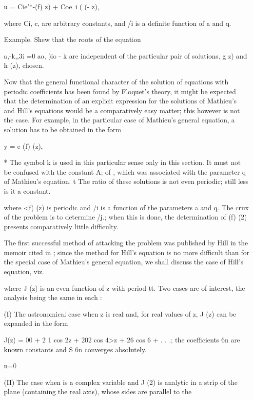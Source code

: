 u = Cie'*-(f) z) + Coe~i ( (- z),

where Ci, c, are arbitrary constants, and /i is a definite function of
a and q.

Example. Shew that the roots of the equation

a,-k,,3i =0 ao, )io - k are independent of the particular pair of
solutions, g z) and h (z), chosen.


Now that the general functional character of the solution of equations
with periodic coefficients has been found by Floquet's theory, it
might be expected that the determination of an explicit expression for
the solutions of Mathieu's and Hill's equations would be a
comparatively easy matter; this however is not the case. For example,
in the particular case of Mathieu's general equation, a solution has
to be obtained in the form

y = e (f) (z),

* The symbol k is used in this particular sense only in this section.
It must not be confused with the constant A; of , which was
associated with the parameter q of Mathieu's equation. t The ratio of
these solutions is not even periodic; still less is it a constant.

%
%

where <f) (z) is periodic and /i is a function of the parameters a and
q. The crux of the problem is to determine /j.; when this is done,
the determination of (f) (2) presents comparatively little difficulty.

The first successful method of attacking the problem was published by
Hill in the memoir cited in ; since the method for Hill's
equation is no more difficult than for the special case of Mathieu's
general equation, we shall discuss the case of Hill's equation, viz.

where J (z) is an even function of z with period tt. Two cases are of
interest, the analysis being the same in each :

(I) The astronomical case when z is real and, for real values of z, J
(z) can be expanded in the form

J(z) = 00 + 2 1 cos 2z + 202 cos 4>z + 26 cos 6 + . . .; the
coefficients 6n are known constants and S 6n converges absolutely.

n=0

(II) The case when is a complex variable and J (2) is analytic in a
strip of the plane (containing the real axis), whose sides are
parallel to the


